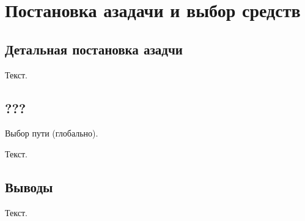 \chapter{Постановка азадачи и выбор средств}

\section{Детальная постановка азадчи}

Текст.

\section{???}

Выбор пути (глобально).

Текст.

\section{Выводы}

Текст.
